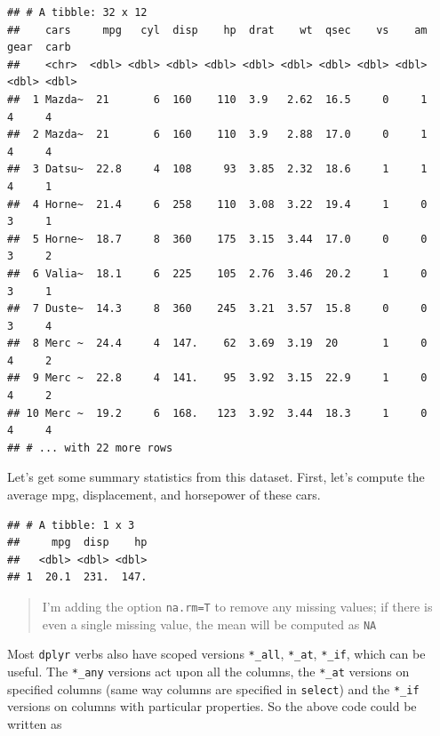 \documentclass[12pt,letterpaperpaper,openany]{book}
\newenvironment{Shaded}{\begin{snugshade}}{\end{snugshade}}
\newcommand{\DataTypeTok}[1]{\textcolor[rgb]{0.13,0.29,0.53}{#1}}
\newcommand{\KeywordTok}[1]{\textcolor[rgb]{0.13,0.29,0.53}{\textbf{#1}}}
\newcommand{\NormalTok}[1]{#1}
\newcommand{\OperatorTok}[1]{\textcolor[rgb]{0.81,0.36,0.00}{\textbf{#1}}}
\newcommand{\StringTok}[1]{\textcolor[rgb]{0.31,0.60,0.02}{#1}}
\begin{document}
\begin{verbatim}
## # A tibble: 32 x 12
##    cars     mpg   cyl  disp    hp  drat    wt  qsec    vs    am  gear  carb
##    <chr>  <dbl> <dbl> <dbl> <dbl> <dbl> <dbl> <dbl> <dbl> <dbl> <dbl> <dbl>
##  1 Mazda~  21       6  160    110  3.9   2.62  16.5     0     1     4     4
##  2 Mazda~  21       6  160    110  3.9   2.88  17.0     0     1     4     4
##  3 Datsu~  22.8     4  108     93  3.85  2.32  18.6     1     1     4     1
##  4 Horne~  21.4     6  258    110  3.08  3.22  19.4     1     0     3     1
##  5 Horne~  18.7     8  360    175  3.15  3.44  17.0     0     0     3     2
##  6 Valia~  18.1     6  225    105  2.76  3.46  20.2     1     0     3     1
##  7 Duste~  14.3     8  360    245  3.21  3.57  15.8     0     0     3     4
##  8 Merc ~  24.4     4  147.    62  3.69  3.19  20       1     0     4     2
##  9 Merc ~  22.8     4  141.    95  3.92  3.15  22.9     1     0     4     2
## 10 Merc ~  19.2     6  168.   123  3.92  3.44  18.3     1     0     4     4
## # ... with 22 more rows
\end{verbatim}

Let's get some summary statistics from this dataset. First, let's compute the average
mpg, displacement, and horsepower of these cars.

\begin{Shaded}
\end{Shaded}

\begin{verbatim}
## # A tibble: 1 x 3
##     mpg  disp    hp
##   <dbl> <dbl> <dbl>
## 1  20.1  231.  147.
\end{verbatim}

\begin{quote}
I'm adding the option \texttt{na.rm=T} to remove any missing values; if there is even a single missing value, the mean will be computed as \texttt{NA}
\end{quote}

Most \texttt{dplyr} verbs also have scoped versions \texttt{*\_all}, \texttt{*\_at}, \texttt{*\_if}, which can be useful. The \texttt{*\_any} versions act
upon all the columns, the \texttt{*\_at} versions on specified columns (same way columns are specified in \texttt{select}) and the
\texttt{*\_if} versions on columns with particular properties. So the above code could be written as
\end{document}
